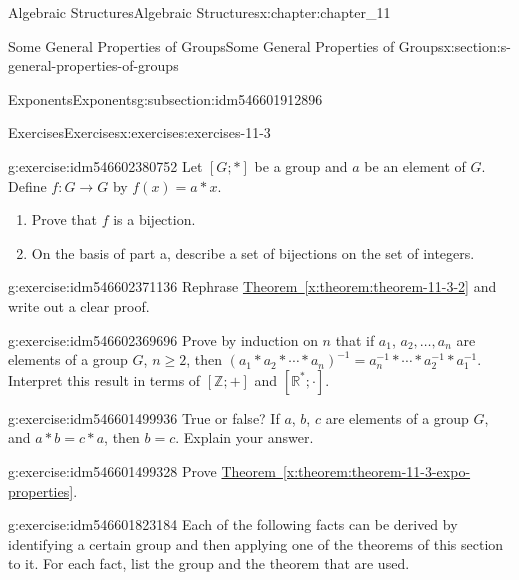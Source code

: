 \documentclass[oneside,10pt,]{book}
\newcommand{\xreffont}{\relax}
\numberwithin{equation}{section}
\begin{document}
\begin{chapterptx}{Algebraic Structures}{}{Algebraic Structures}{}{}{x:chapter:chapter_11}
\begin{sectionptx}{Some General Properties of Groups}{}{Some General Properties of Groups}{}{}{x:section:s-general-properties-of-groups}
\begin{subsectionptx}{Exponents}{}{Exponents}{}{}{g:subsection:idm546601912896}
\begin{itemize}[label=\textbullet]
\end{itemize}
%
\end{subsectionptx}
%
%
\typeout{************************************************}
\typeout{************************************************}
%
\begin{exercises-subsection}{Exercises}{}{Exercises}{}{}{x:exercises:exercises-11-3}
\begin{divisionexercise}{1}{}{}{g:exercise:idm546602380752}%
Let \([G; * ]\) be a group and \(a\) be an element of \(G\).  Define \(f:G \to  G\) by \(f(x) = a * x\).%
\begin{enumerate}[label=(\alph*)]
\item{}Prove that \(f\) is a bijection.%
\item{}On the basis of part a, describe a set of bijections on the set of integers.%
\end{enumerate}
%
\end{divisionexercise}%
\begin{divisionexercise}{2}{}{}{g:exercise:idm546602371136}%
Rephrase \hyperref[x:theorem:theorem-11-3-2]{Theorem~{\xreffont\ref{x:theorem:theorem-11-3-2}}} and write out a clear proof.%
\end{divisionexercise}%
\begin{divisionexercise}{3}{}{}{g:exercise:idm546602369696}%
Prove by induction on \(n\) that if \(a_1\), \(a_2,\ldots , a_n\) are elements of a group \(G\), \(n\geq 2\), then \(\left(a_1*a_2*\cdots *a_n\right)^{-1}= a_n^{-1}*\cdots *a_2^{-1}*a_1^{-1}\). Interpret this result in terms of \([\mathbb{Z}; +]\) and \([\mathbb{R}^*;\cdot]\).%
\end{divisionexercise}%
\begin{divisionexercise}{4}{}{}{g:exercise:idm546601499936}%
True or false? If \(a\), \(b\), \(c\) are elements of a group \(G\), and \(a * b = c * a\), then \(b = c\). Explain your answer.%
\end{divisionexercise}%
\begin{divisionexercise}{5}{}{}{g:exercise:idm546601499328}%
Prove \hyperref[x:theorem:theorem-11-3-expo-properties]{Theorem~{\xreffont\ref{x:theorem:theorem-11-3-expo-properties}}}.%
\end{divisionexercise}%
\begin{divisionexercise}{6}{}{}{g:exercise:idm546601823184}%
Each of the following facts can be derived by identifying a certain group and then applying one of the theorems of this section to it. For each fact, list the group and the theorem that are used.%

\end{divisionexercise}
\end{exercises-subsection}
\end{sectionptx}
\end{chapterptx}
\end{document}
